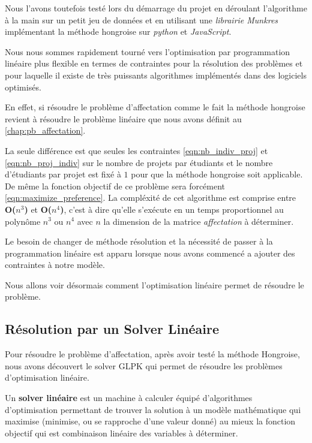 \documentclass[final,poster]{polytech/polytech}
\begin{document}
Nous l'avons toutefois testé lors du démarrage du projet en déroulant l'algorithme à la main sur un petit jeu de données et en utilisant une \textit{librairie Munkres} implémentant la méthode hongroise sur \textit{python} et \textit{JavaScript}.


Nous nous sommes rapidement tourné vers l'optimisation par programmation linéaire plus flexible en termes de contraintes pour la résolution des problèmes et pour laquelle il existe de très puissants algorithmes implémentés dans des logiciels optimisés.

En effet, si résoudre le problème d'affectation comme le fait la méthode hongroise revient à résoudre le problème linéaire que nous avons définit au \autoref{chap:pb_affectation}.

La seule différence est que seules les contraintes \autoref{eqn:nb_indiv_proj} et \autoref{eqn:nb_proj_indiv} sur le nombre de projets par étudiants et le nombre d'étudiants par projet est fixé à $1$ pour que la méthode hongroise soit applicable.
De même la fonction objectif de ce problème sera forcément \autoref{eqn:maximize_preference}. La compléxité de cet algorithme est comprise entre \textbf{O($n^3$)} et  \textbf{O($n^4$)}, c'est à dire qu'elle s'exécute en un temps proportionnel au polynôme $n^3$ ou $n^4$ avec $n$ la dimension de la matrice \textit{affectation} à déterminer.

Le besoin de changer de méthode résolution et la nécessité de passer à la programmation linéaire est apparu lorsque nous avons commencé a ajouter des contraintes à notre modèle.

Nous allons voir désormais comment l'optimisation linéaire permet de résoudre le problème.

\subsection{Résolution par un Solver Linéaire}

Pour résoudre le problème d'affectation, après avoir testé la méthode Hongroise, nous avons découvert le solver GLPK qui permet de résoudre les problèmes d'optimisation linéaire.

Un \textbf{solver linéaire}  est un machine à calculer équipé d'algorithmes d'optimisation permettant de trouver la solution à un modèle mathématique qui maximise (minimise, ou se rapproche d'une valeur donné) au mieux la fonction objectif qui est combinaison linéaire des variables à déterminer.
\end{document}
